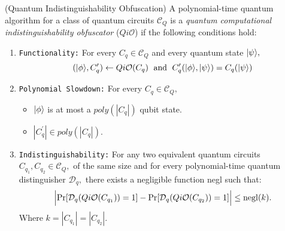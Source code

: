 \begin{definition}{\rm (Quantum Indistinguishability Obfuscation)}
\label{def:QiO}
A  polynomial-time quantum algorithm for a class of quantum circuits $\mathcal{C}_Q$ is a \emph{quantum computational indistinguishability obfuscator} ($Qi\mathcal{O}$)  if the following conditions hold:

\begin{enumerate}
\item {\tt Functionality:}  For every $C_q\in \mathcal{C}_Q$ and every quantum state ${\lvert}\psi\rangle,$
$$({\lvert}\phi\rangle, C_q^\prime)\leftarrow Qi\mathcal{O}(C_q) \;  \mbox{ and }\; C_q^\prime({\lvert}\phi\rangle,{\lvert}\psi\rangle)=C_{q}({\lvert}\psi\rangle)$$
											

\item  {\tt Polynomial Slowdown:}  For every $C_{q}\in \mathcal{C}_Q,$
\begin{itemize}
\item  ${\lvert}\phi\rangle$ is at most a $poly(|C_{q}|)$ qubit state.
\item $|C_{q}^\prime| \in poly(|C_{q}|).$
\end{itemize}

\item {\tt Indistinguishability:} For any two equivalent quantum circuits $C_{q_1},C_{q_2}\in \mathcal{C}_Q,$ of the same size
 and for every polynomial-time quantum distinguisher $\mathcal{D}_q,$ there exists a negligible function {\rm negl} such that:
					$$\Big |{\rm Pr}[\mathcal{D}_q(Qi\mathcal{O}(C_{q_1}))=1]-{\rm Pr}[\mathcal{D}_q(Qi\mathcal{O}(C_{q_2}))=1] \Big |\leq  {\rm negl}(k).$$		
Where $k=|C_{q_1}|=|C_{q_2}|.$						
\end{enumerate}
\end{definition}


